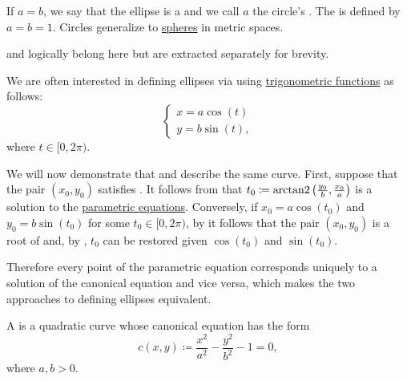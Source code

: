 \begin{definition}
\begin{thmenum}
    If \( a = b \), we say that the ellipse is a  and we call \( a \) the circle's . The  is defined by \( a = b = 1 \). Circles generalize to \hyperref[def:metric_space/sphere]{spheres} in metric spaces.

     and  logically belong here but are extracted separately for brevity.

    We are often interested in defining ellipses via  using \hyperref[def:trigonometric_functions]{trigonometric functions} as follows:
    \begin{equation}\label{def:quadratic_plane_curve/ellipse/parametric_equations}
      \begin{cases}
        x = a \cos(t) \\
        y = b \sin(t),
      \end{cases}
    \end{equation}
    where \( t \in [0, 2\pi) \).

    We will now demonstrate that  and  describe the same curve. First, suppose that the pair \( (x_0, y_0) \) satisfies . It follows from  that \( t_0 \coloneqq \operatorname{arctan2}\left(\tfrac {y_0} b, \tfrac {x_0} a \right) \) is a solution to the \hyperref[def:quadratic_plane_curve/ellipse/parametric_equations]{parametric equations}. Conversely, if \( x_0 = a \cos(t_0) \) and \( y_0 = b \sin(t_0) \) for some \( t_0 \in [0, 2\pi) \), by  it follows that the pair \( (x_0, y_0) \) is a root of  and, by , \( t_0 \) can be restored given \( \cos(t_0) \) and \( \sin(t_0) \).

    Therefore every point of the parametric equation  corresponds uniquely to a solution of the canonical equation  and vice versa, which makes the two approaches to defining ellipses equivalent.

     A  is a quadratic curve whose canonical equation has the form
    \begin{equation}\label{def:quadratic_plane_curve/hyperbola/canonical_equation}
      c(x, y) \coloneqq \frac {x^2} {a^2} - \frac {y^2} {b^2} - 1 = 0,
    \end{equation}
    where \( a, b > 0 \).


\end{thmenum}
\end{definition}
